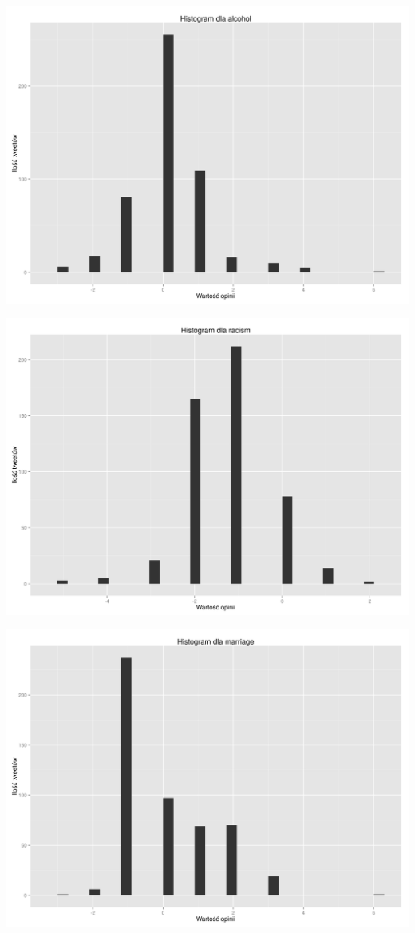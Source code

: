 \documentclass[12pt,a4paper]{report}
\begin{document}
\begin{center}
\includegraphics[scale=0.35]{pictures/Histalcohol.png}
\end{center}

\begin{center}
\includegraphics[scale=0.35]{pictures/Histracism.png}
\end{center}

\begin{center}
\includegraphics[scale=0.35]{pictures/Histmarriage.png}
\end{center}
\end{document}
